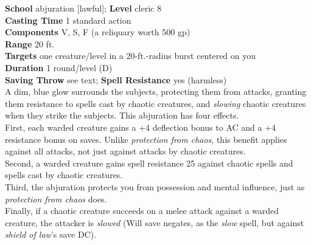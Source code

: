 \textbf{School} abjuration [lawful]; \textbf{Level} cleric 8\\
\textbf{Casting Time} 1 standard action\\
\textbf{Components} V, S, F (a reliquary worth 500 gp)\\
\textbf{Range} 20 ft.\\
\textbf{Targets} one creature/level in a 20-ft.-radius burst centered on you\\
\textbf{Duration} 1 round/level (D)\\
\textbf{Saving Throw} see text; \textbf{Spell Resistance} yes (harmless)\\
A dim, blue glow surrounds the subjects, protecting them from attacks, granting them resistance to spells cast by chaotic creatures, and \textit{slowing }chaotic creatures when they strike the subjects. This abjuration has four effects.\\
First, each warded creature gains a +4 deflection bonus to AC and a +4 resistance bonus on saves. Unlike \textit{protection from chaos}, this benefit applies against all attacks, not just against attacks by chaotic creatures.\\
Second, a warded creature gains spell resistance 25 against chaotic spells and spells cast by chaotic creatures.\\
Third, the abjuration protects you from possession and mental influence, just as \textit{protection from chaos }does.\\
Finally, if a chaotic creature succeeds on a melee attack against a warded creature, the attacker is \textit{slowed }(Will save negates, as the \textit{slow }spell, but against \textit{shield of law}'s save DC).\\
